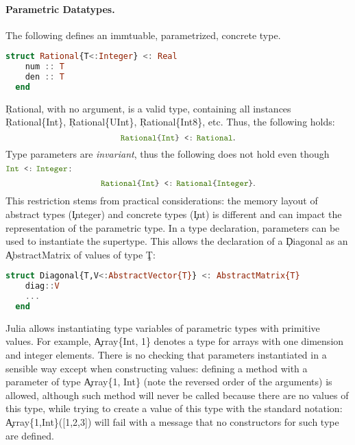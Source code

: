 \paragraph{Parametric Datatypes.}
The following defines an immtuable, para\-metrized, concrete type.
\begin{lstlisting}[language=julia]
  struct Rational{T<:Integer} <: Real
    num :: T
    den :: T
  end
\end{lstlisting}
\noindent
\c{Rational}, with no argument, is a valid type, containing all instances
\c{Rational\{Int\}}, \c{Rational\{UInt\}}, \c{Rational\{Int8\}},
etc.  Thus, the following holds:
\[ \texttt{\small\color{jlbuiltin} Rational}   \texttt{\small\color{jlkeyword} \{}   \texttt{\small\color{jlbuiltin}\color{jlbuiltin} Int}   \texttt{\small\color{jlkeyword} \}\kern0pt}  \,\,\, \texttt{\small\color{jlkeyword} <:}\,\,   \texttt{\small\color{jlbuiltin} Rational}. \]
Type parameters are \emph{invariant}, thus the following does not hold
even though \( \texttt{\small\color{jlbuiltin}\color{jlbuiltin} Int} \,\,\, \texttt{\small\color{jlkeyword} <:}\,\, \texttt{\small\color{jlbuiltin}\color{jlbuiltin} Integer} \):
\[ \texttt{\small\color{jlbuiltin} Rational}   \texttt{\small\color{jlkeyword} \{}   \texttt{\small\color{jlbuiltin}\color{jlbuiltin} Int}   \texttt{\small\color{jlkeyword} \}\kern0pt}  \,\,\, \texttt{\small\color{jlkeyword} <:}\,\,   \texttt{\small\color{jlbuiltin} Rational}   \texttt{\small\color{jlkeyword} \{}   \texttt{\small\color{jlbuiltin} Integer}   \texttt{\small\color{jlkeyword} \}\kern0pt}.\]
This restriction stems from
practical considerations: the memory layout of abstract types
(\c{Integer}) and concrete types (\c{Int}) is different and can impact
the representation of the parametric type.  In a type declaration,
parameters can be used to instantiate the supertype. This allows the
declaration of a \c{Diagonal} as an
\c{AbstractMatrix} of values of type \c{T}:
\begin{lstlisting}[language=julia]
  struct Diagonal{T,V<:AbstractVector{T}} <: AbstractMatrix{T}
    diag::V
    ...
  end
\end{lstlisting}

Julia allows instantiating type variables of parametric types with primitive
values. For example, \c{Array\{Int, 1\}} denotes a type for arrays with one
dimension and integer elements. There is no checking that parameters
instantiated in a sensible way except when constructing values: defining a
method with a parameter of type \c{Array\{1, Int\}} (note the reversed order of
the arguments) is allowed, although such method will never be called because
there are no values of this type, while trying to create a value of this type
with the standard notation: \c{Array\{1,Int\}([1,2,3])} will fail with a message that
no constructors for such type are defined.

